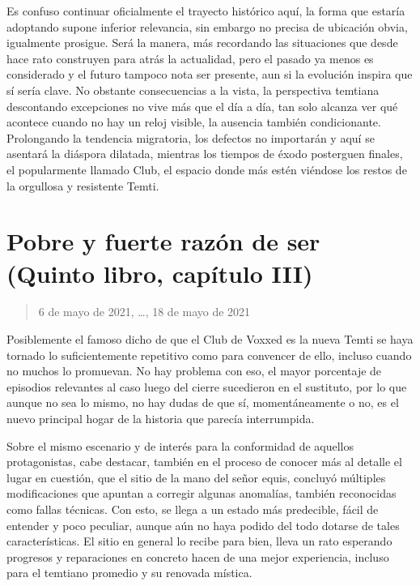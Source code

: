 \documentclass[
]{book}
\begin{document}
Es confuso continuar oficialmente el trayecto histórico aquí, la forma que estaría adoptando supone inferior relevancia, sin embargo no precisa de ubicación obvia, igualmente prosigue. Será la manera, más recordando las situaciones que desde hace rato construyen para atrás la actualidad, pero el pasado ya menos es considerado y el futuro tampoco nota ser presente, aun si la evolución inspira que sí sería clave. No obstante consecuencias a la vista, la perspectiva temtiana descontando excepciones no vive más que el día a día, tan solo alcanza ver qué acontece cuando no hay un reloj visible, la ausencia también condicionante. Prolongando la tendencia migratoria, los defectos no importarán y aquí se asentará la diáspora dilatada, mientras los tiempos de éxodo posterguen finales, el popularmente llamado Club, el espacio donde más estén viéndose los restos de la orgullosa y resistente Temti.

\hypertarget{pobre-y-fuerte-razuxf3n-de-ser-quinto-libro-capuxedtulo-iii}{%
\section{Pobre y fuerte razón de ser (Quinto libro, capítulo III)}\label{pobre-y-fuerte-razuxf3n-de-ser-quinto-libro-capuxedtulo-iii}}

\begin{quote}
6 de mayo de 2021, \ldots, 18 de mayo de 2021
\end{quote}

Posiblemente el famoso dicho de que el Club de Voxxed es la nueva Temti se haya tornado lo suficientemente repetitivo como para convencer de ello, incluso cuando no muchos lo promuevan. No hay problema con eso, el mayor porcentaje de episodios relevantes al caso luego del cierre sucedieron en el sustituto, por lo que aunque no sea lo mismo, no hay dudas de que sí, momentáneamente o no, es el nuevo principal hogar de la historia que parecía interrumpida.

Sobre el mismo escenario y de interés para la conformidad de aquellos protagonistas, cabe destacar, también en el proceso de conocer más al detalle el lugar en cuestión, que el sitio de la mano del señor equis, concluyó múltiples modificaciones que apuntan a corregir algunas anomalías, también reconocidas como fallas técnicas. Con esto, se llega a un estado más predecible, fácil de entender y poco peculiar, aunque aún no haya podido del todo dotarse de tales características. El sitio en general lo recibe para bien, lleva un rato esperando progresos y reparaciones en concreto hacen de una mejor experiencia, incluso para el temtiano promedio y su renovada mística.
\end{document}
